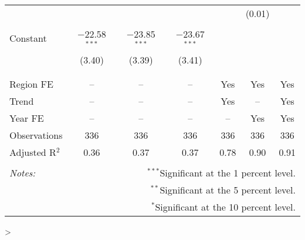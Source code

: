 \documentclass[10pt]{article}
\begin{document}
\begin{table}[!htbp]
\begin{tabular}{@{\extracolsep{5pt}}lcccccc}
  &  &  &  &  & (0.01) &  \\ 
  & & & & & & \\ 
 Constant & $-$22.58$^{***}$ & $-$23.85$^{***}$ & $-$23.67$^{***}$ &  &  &  \\ 
  & (3.40) & (3.39) & (3.41) &  &  &  \\ 
  & & & & & & \\ 
\hline \\[-1.8ex] 
Region FE & -- & -- & -- & Yes & Yes & Yes \\ 
Trend & -- & -- & -- & Yes & -- & Yes \\ 
Year FE & -- & -- & -- & -- & Yes & Yes \\ 
Observations & 336 & 336 & 336 & 336 & 336 & 336 \\ 
Adjusted R$^{2}$ & 0.36 & 0.37 & 0.37 & 0.78 & 0.90 & 0.91 \\ 
\hline 
\hline \\[-1.8ex] 
\textit{Notes:} & \multicolumn{6}{r}{$^{***}$Significant at the 1 percent level.} \\ 
 & \multicolumn{6}{r}{$^{**}$Significant at the 5 percent level.} \\ 
 & \multicolumn{6}{r}{$^{*}$Significant at the 10 percent level.} \\ 
\end{tabular} 
\end{table} 
> 
\end{document}
